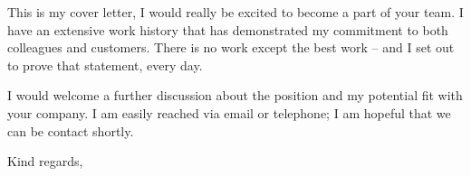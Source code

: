 
This is my cover letter, I would really be excited to become a part of your team.  I have an extensive work history that has demonstrated my 
commitment to both colleagues and customers. There is no work except the best work -- and I set out to prove that statement, every day.

I would welcome a further discussion about the position and my potential fit with your company.  I am easily reached via email or telephone; 
I am hopeful that we can be contact shortly.

\closing{Kind regards,}



